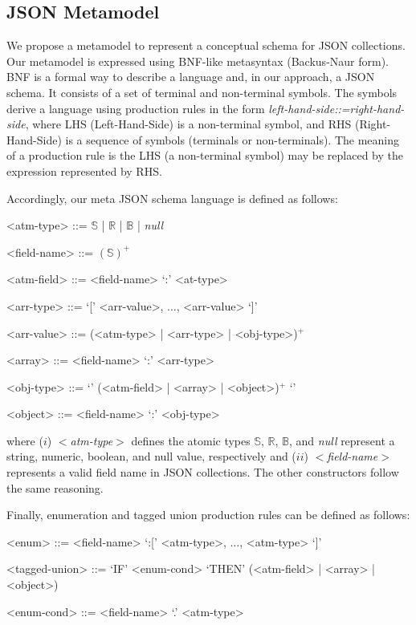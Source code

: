 \subsection{JSON Metamodel}
\label{subsec:meta}

We propose a metamodel to represent a conceptual schema for JSON collections. 
Our metamodel is expressed using BNF-like metasyntax (Backus-Naur form). 
BNF is a formal way to describe a language and, in our approach, a JSON schema. 
It consists of a set of terminal and non-terminal symbols. 
The symbols derive a language using production rules in the form \textit{left-hand-side::=right-hand-side}, where LHS (Left-Hand-Side) is a non-terminal symbol, and RHS (Right-Hand-Side) is a sequence of symbols (terminals or non-terminals). 
The meaning of a production rule is the LHS (a non-terminal symbol) may be replaced by the expression represented by RHS.

Accordingly, our meta JSON schema language is defined as follows:
\setlength{\grammarindent}{81pt} %
\begin{grammar}
\parsep\grammarparsep
<atm-type> ::= $\mathbb{S}$ | $\mathbb{R}$ | $\mathbb{B}$ | \textit{null}

<field-name> ::= $(\mathbb{S})^+$

<atm-field> ::= <field-name> `:' <at-type>

<arr-type> ::= `[' <arr-value>, $\dots$, <arr-value> `]'

<arr-value> ::= (<atm-type> | <arr-type> | <obj-type>)$^+$

<array> ::= <field-name> `:' <arr-type>

<obj-type> ::= `{' (<atm-field> | <array> | <object>)$^+$ `}'

<object> ::= <field-name> `:' <obj-type>
\end{grammar}

\noindent where ($i$) \(<\)\textit{atm-type}\(>\)  defines the atomic types $\mathbb{S}$, $\mathbb{R}$, $\mathbb{B}$, and  \textit{null} represent a string, numeric, boolean, and null value, respectively and  ($ii$) \(<\)\textit{field-name}\(>\) represents a valid field name in JSON collections. The other constructors follow the same reasoning. 


Finally, enumeration and tagged union production rules can be defined as follows:

\setlength{\grammarindent}{95pt} %
\begin{grammar}
\parsep\grammarparsep
<enum> ::= <field-name> `:[' <atm-type>, $\dots$, <atm-type> `]'

<tagged-union> ::= `IF' <enum-cond> `THEN' (<atm-field> | <array> | <object>)

<enum-cond> ::= <field-name> `.' <atm-type>
\end{grammar}

